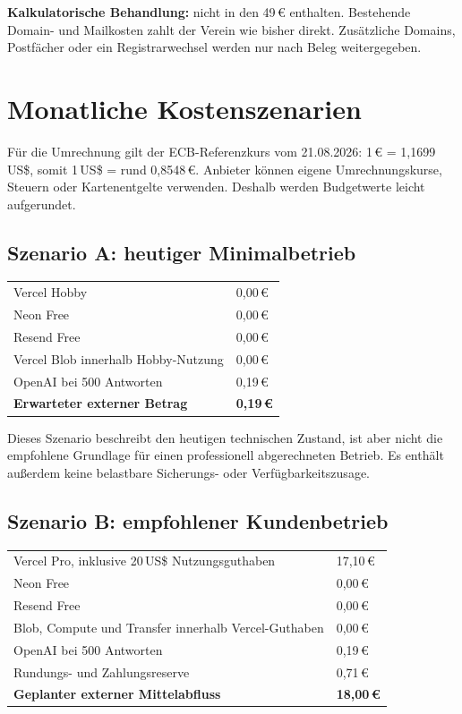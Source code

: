 \documentclass[11pt,a4paper]{article}
\newcommand{\eur}[1]{#1\,€}
\newcommand{\usd}[1]{#1\,US\$}
\begin{document}
\textbf{Kalkulatorische Behandlung:} nicht in den \eur{49} enthalten. Bestehende Domain- und Mailkosten zahlt der Verein wie bisher direkt. Zusätzliche Domains, Postfächer oder ein Registrarwechsel werden nur nach Beleg weitergegeben.

\section{Monatliche Kostenszenarien}

Für die Umrechnung gilt der ECB-Referenzkurs vom 21.08.2026: \eur{1} = \usd{1,1699}, somit \usd{1} = rund \eur{0,8548}. Anbieter können eigene Umrechnungskurse, Steuern oder Kartenentgelte verwenden. Deshalb werden Budgetwerte leicht aufgerundet.

\subsection{Szenario A: heutiger Minimalbetrieb}

\begin{tabularx}{\textwidth}{Y R{30mm}}
  \toprule
  Vercel Hobby & \eur{0,00} \\
  Neon Free & \eur{0,00} \\
  Resend Free & \eur{0,00} \\
  Vercel Blob innerhalb Hobby-Nutzung & \eur{0,00} \\
  OpenAI bei 500 Antworten & \eur{0,19} \\
  \midrule
  \sffamily\bfseries Erwarteter externer Betrag & \sffamily\bfseries\eur{0,19} \\
  \bottomrule
\end{tabularx}

Dieses Szenario beschreibt den heutigen technischen Zustand, ist aber nicht die empfohlene Grundlage für einen professionell abgerechneten Betrieb. Es enthält außerdem keine belastbare Sicherungs- oder Verfügbarkeitszusage.

\subsection{Szenario B: empfohlener Kundenbetrieb}

\begin{tabularx}{\textwidth}{Y R{30mm}}
  \toprule
  Vercel Pro, inklusive \usd{20} Nutzungsguthaben & \eur{17,10} \\
  Neon Free & \eur{0,00} \\
  Resend Free & \eur{0,00} \\
  Blob, Compute und Transfer innerhalb Vercel-Guthaben & \eur{0,00} \\
  OpenAI bei 500 Antworten & \eur{0,19} \\
  Rundungs- und Zahlungsreserve & \eur{0,71} \\
  \midrule
  \sffamily\bfseries Geplanter externer Mittelabfluss & \sffamily\bfseries\eur{18,00} \\
  \bottomrule
\end{tabularx}
\end{document}
